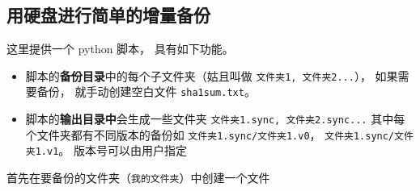 \subsection{用硬盘进行简单的增量备份}
这里提供一个 python 脚本， 具有如下功能。

\begin{itemize}
\item 脚本的\textbf{备份目录}中的每个子文件夹（姑且叫做 \verb|文件夹1, 文件夹2...|）， 如果需要备份， 就手动创建空白文件 \verb|sha1sum.txt|。
\item 脚本的\textbf{输出目录中}会生成一些文件夹 \verb|文件夹1.sync, 文件夹2.sync...| 其中每个文件夹都有不同版本的备份如 \verb|文件夹1.sync/文件夹1.v0|， \verb|文件夹1.sync/文件夹1.v1|。 版本号可以由用户指定
\end{itemize}

首先在要备份的文件夹（\verb|我的文件夹|）中创建一个文件 

